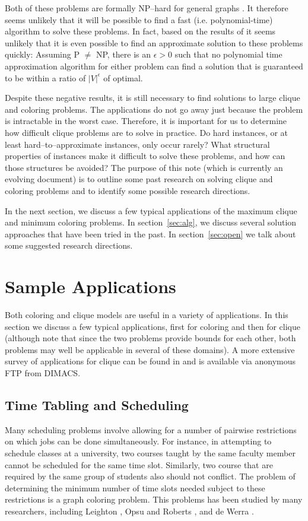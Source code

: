 Both of these problems are formally NP--hard for general graphs
\cite{GaJo79}.  It therefore seems unlikely that it will be possible
to find a fast (i.e. polynomial-time) algorithm to solve these
problems.  In fact, based on the results of
\cite{FGLSS91,ArSa92,ALMSS92,LuYa93} it seems unlikely that it is even
possible to find an approximate solution to these problems quickly:
Assuming P $\neq$ NP, there is an $\epsilon > 0$ such that no
polynomial time approximation algorithm for either problem can find a
solution that is guaranteed to be within a ratio of $|V|^\epsilon$ of
optimal.

Despite these negative results, it is still necessary to find
solutions to large clique and coloring problems.  The applications do
not go away just because the problem is intractable in the worst case.
Therefore, it is important for us to determine how difficult clique
problems are to solve in practice.  Do hard instances, or at least
hard--to--approximate instances, only occur rarely?
What structural properties of instances make it difficult to solve these problems,
and how can those structures be avoided?  The purpose of this note
(which is currently an evolving document) is to outline some past
research on solving clique and coloring problems and to identify some
possible research directions.

In the next section, we discuss a few typical applications of the
maximum clique and minimum coloring problems.  In
section~\ref{sec:alg}, we discuss several solution
approaches that have been tried in the past.  In
section~\ref{sec:open} we talk about some suggested research
directions.  

\section{Sample Applications}

Both coloring and clique models are useful in a variety of
applications.  In this section we discuss a few typical applications,
first for coloring and then for clique (although note that since
the two problems provide bounds for each other, both problems may
well be applicable in several of these domains).
A more extensive survey of applications for clique can be found in
\cite{HPV92} and is available via anonymous FTP from DIMACS.

\subsection{Time Tabling and Scheduling}  Many scheduling problems
involve allowing for a number of pairwise restrictions on which jobs
can be done simultaneously.  For instance, in attempting to schedule
classes at a university, two courses taught by the same faculty member
cannot be scheduled for the same time slot.  Similarly, two course
that are required by the same group of students also should not
conflict.  The problem of determining the minimum number of time slots
needed subject to these restrictions is a graph coloring problem.
This problems has been studied by many researchers, including
Leighton \cite{Le79}, Opsu and Roberts \cite{OpRo81}, and de Werra
\cite{De85}.

